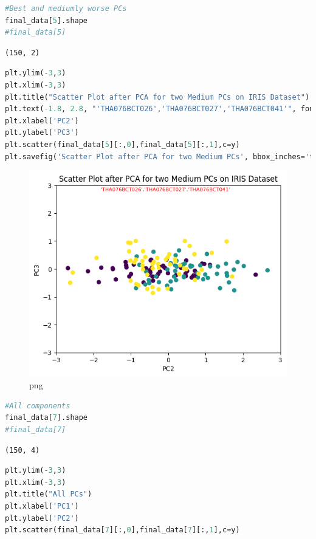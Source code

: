 \documentclass[
]{article}
\begin{document}
\begin{lstlisting}[language=Python]
#Best and mediumly worse PCs
final_data[5].shape
#final_data[5]
\end{lstlisting}

\begin{lstlisting}
(150, 2)
\end{lstlisting}

\begin{lstlisting}[language=Python]
plt.ylim(-3,3)
plt.xlim(-3,3)
plt.title("Scatter Plot after PCA for two Medium PCs on IRIS Dataset")
plt.text(-1.8, 2.8, "'THA076BCT026','THA076BCT027','THA076BCT041'", fontsize=8,color='red')
plt.xlabel('PC2')
plt.ylabel('PC3')
plt.scatter(final_data[5][:,0],final_data[5][:,1],c=y)
plt.savefig('Scatter Plot after PCA for two Medium PCs', bbox_inches='tight')
\end{lstlisting}

\begin{figure}
\centering
\includegraphics{PCA on IRIS_files/PCA on IRIS_52_0.png}
\caption{png}
\end{figure}

\begin{lstlisting}[language=Python]
#All components
final_data[7].shape
#final_data[7]
\end{lstlisting}

\begin{lstlisting}
(150, 4)
\end{lstlisting}

\begin{lstlisting}[language=Python]
plt.ylim(-3,3)
plt.xlim(-3,3)
plt.title("All PCs")
plt.xlabel('PC1')
plt.ylabel('PC2')
plt.scatter(final_data[7][:,0],final_data[7][:,1],c=y)
\end{lstlisting}
\end{document}
